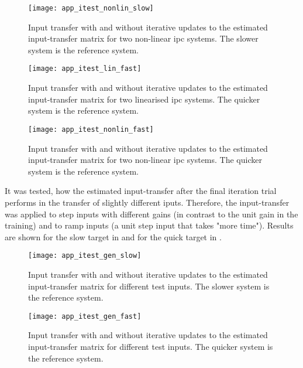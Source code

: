  \begin{figure}
         \centering
         \texttt{[image: app\_itest\_nonlin\_slow]}
         \caption[Iterative Estimation -- Non-Linear Systems and Slow Reference]{Input transfer with and without iterative updates to the estimated input-transfer matrix for two non-linear \acrshort{ipc} systems. The slower system is the reference system.}
         \label{fig:app_itest_nonlin_slow}
 \end{figure} 
 
  \begin{figure}
         \centering
         \texttt{[image: app\_itest\_lin\_fast]}
         \caption[Iterative Estimation -- Linear Systems and Fast Reference]{Input transfer with and without iterative updates to the estimated input-transfer matrix for two linearised \acrshort{ipc} systems. The quicker system is the reference system.}
         \label{fig:app_itest_lin_fast}
 \end{figure} 
 
  \begin{figure}
         \centering
         \texttt{[image: app\_itest\_nonlin\_fast]}
         \caption[Iterative Estimation -- Non-Linear Systems and Fast Reference]{Input transfer with and without iterative updates to the estimated input-transfer matrix for two non-linear \acrshort{ipc} systems. The quicker system is the reference system.}
         \label{fig:app_itest_nonlin_fast}
 \end{figure} 
 
 
It was tested, how the estimated input-transfer after the final iteration trial performs in the transfer of slightly different iputs. Therefore, the input-transfer was applied to step inputs with different gains (in contrast to the unit gain in the training) and to ramp inputs (a unit step input that takes "more time"). Results are shown for the slow target in  and for the quick target in .

  \begin{figure}
         \centering
         \texttt{[image: app\_itest\_gen\_slow]}
         \caption[Iterative Estimation -- Test Data and Fast Reference]{Input transfer with and without iterative updates to the estimated input-transfer matrix for different test inputs. The slower system is the reference system.}
         \label{fig:app_itest_gen_slow}
 \end{figure} 
 
  \begin{figure}
         \centering
         \texttt{[image: app\_itest\_gen\_fast]}
         \caption[Iterative Estimation -- Test Data and Slow Reference]{Input transfer with and without iterative updates to the estimated input-transfer matrix for different test inputs. The quicker system is the reference system.}
         \label{fig:app_itest_gen_fast}
 \end{figure} 
 
 
 